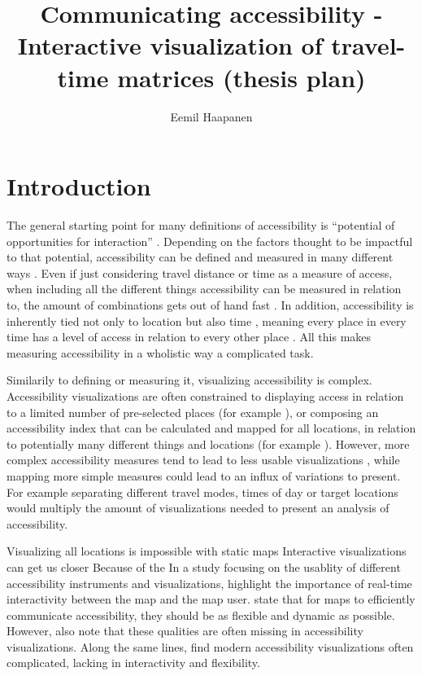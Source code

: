 \documentclass{article}
\title{Communicating accessibility - Interactive visualization of travel-time matrices (thesis  plan)}
\author{Eemil Haapanen}
\begin{document}
\maketitle

\section{Introduction}

The general starting point for many definitions of accessibility is
\enquote{potential of opportunities for interaction} \parencite{han1959}.
Depending on the factors thought to be impactful to that potential,
accessibility can be defined and measured in many different ways \parencite{pap2016}.
Even if just considering travel distance or time as a measure of access,
when including all the different things accessibility can be measured in relation to,
the amount of combinations gets out of hand fast \parencite{lev2020}.
In addition, accessibility is inherently tied not only to location
but also time \parencite{jar2018},
meaning every place in every time has a level of access
in relation to every other place \parencite{lev2020}.
All this makes measuring accessibility in a wholistic way a complicated task.

Similarily to defining or measuring it, visualizing accessibility is complex.
Accessibility visualizations are often constrained to
displaying access in relation to a limited number of pre-selected places (for example \textcite{wei2018}),
or composing an accessibility index
that can be calculated and mapped for all locations,
in relation to potentially many different things and locations (for example \textcite{kim2019}).
However, more complex accessibility measures tend to lead to
less usable visualizations \parencite{te2014},
while mapping more simple measures could lead to an influx of variations to present.
For example separating different travel modes, times of day or target locations
would multiply the amount of visualizations needed to present an analysis of accessibility.



Visualizing all locations is impossible with static maps
Interactive visualizations can get us closer
Because of the 
In a study focusing on the usablity of different accessibility instruments and visualizations,  %
\textcite{te2014} highlight the importance of real-time interactivity between the map and the map user.
\textcite{but2018} state that for maps to efficiently communicate accessibility,
they should be as flexible and dynamic as possible. However, \citeauthor{but2018} also note that these qualities are often missing in accessibility visualizations.
Along the same lines, \textcite{paj2021} find modern accessibility visualizations often complicated,
lacking in interactivity and flexibility.
\end{document}
